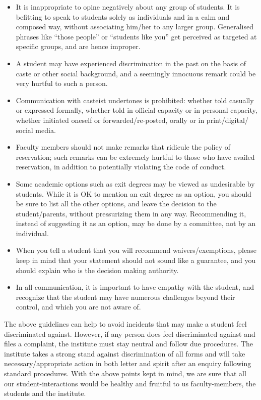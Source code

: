 \documentclass[
  10pt,
  a5paper,
  10pt,
  openany]{amsbook}
\providecommand{\tightlist}{%
  \setlength{\itemsep}{0pt}\setlength{\parskip}{0pt}}
\begin{document}
\begin{itemize}
\tightlist
\item
  It is inappropriate to opine negatively about any group of students.
  It is befitting to speak to students solely as individuals and in a
  calm and composed way, without associating him/her to any larger
  group. Generalised phrases like ``those people'' or ``students like
  you'' get perceived as targeted at specific groups, and are hence
  improper.
\item
  A student may have experienced discrimination in the past on the basis
  of caste or other social background, and a seemingly innocuous remark
  could be very hurtful to such a person.
\item
  Communication with casteist undertones is prohibited: whether told
  casually or expressed formally, whether told in official capacity or
  in personal capacity, whether initiated oneself or
  forwarded/re-posted, orally or in print/digital/ social media.
\item
  Faculty members should not make remarks that ridicule the policy of
  reservation; such remarks can be extremely hurtful to those who have
  availed reservation, in addition to potentially violating the code of
  conduct.
\item
  Some academic options such as exit degrees may be viewed as
  undesirable by students. While it is OK to mention an exit degree as
  an option, you should be sure to list all the other options, and leave
  the decision to the student/parents, without pressurizing them in any
  way. Recommending it, instead of suggesting it as an option, may be
  done by a committee, not by an individual.
\item
  When you tell a student that you will recommend waivers/exemptions,
  please keep in mind that your statement should not sound like a
  guarantee, and you should explain who is the decision making
  authority.
\item
  In all communication, it is important to have empathy with the
  student, and recognize that the student may have numerous challenges
  beyond their control, and which you are not aware of.
\end{itemize}

The above guidelines can help to avoid incidents that may make a student
feel discriminated against. However, if any person does feel
discriminated against and files a complaint, the institute must stay
neutral and follow due procedures. The institute takes a strong stand
against discrimination of all forms and will take necessary/appropriate
action in both letter and spirit after an enquiry following standard
procedures. With the above points kept in mind, we are sure that all our
student-interactions would be healthy and fruitful to us
faculty-members, the students and the institute.
\end{document}
